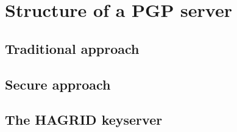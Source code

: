 
\section{Structure of a PGP server}
\newpage

\subsection{Traditional approach}

\subsection{Secure approach}
\newpage

\subsection{The HAGRID keyserver}
\newpage
